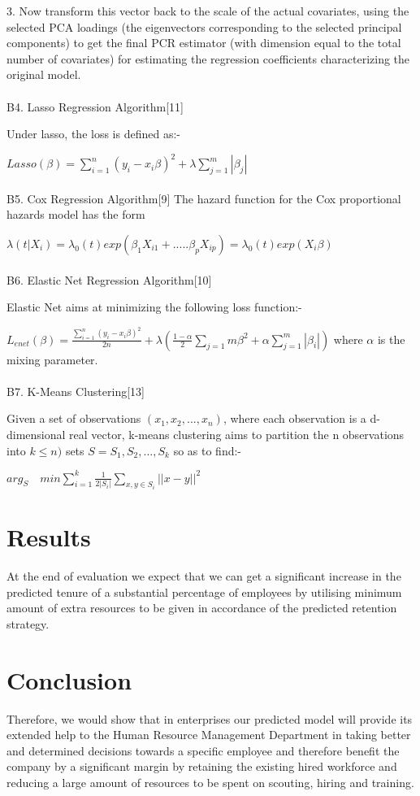 \documentclass[a4paper, 14 pt, conference]{ieeeconf}
\begin{document}
    3. Now transform this vector back to the scale of the actual covariates, using the selected PCA loadings (the eigenvectors corresponding to the selected principal components) to get the final PCR estimator (with dimension equal to the total number of covariates) for estimating the regression coefficients characterizing the original model.
\\
\\
B4. Lasso Regression Algorithm[11]

Under lasso, the loss is defined as:-

$Lasso(\beta)=\sum_{i=1}^{n}(y_{i}-x_{i}\beta)^2+\lambda\sum_{j=1}^{m}|\beta_{j}|$
\\
\\
B5. Cox Regression Algorithm[9]
The hazard function for the Cox proportional hazards model has the form

        $ \lambda(t|X_{i})= \lambda_{0}(t)exp( \beta_{1}X_{i1}+ .....  \beta_{p} X_{ip})= \lambda_{0}(t)exp(X_{i} \beta)$
\\
\\
B6. Elastic Net Regression Algorithm[10]

Elastic Net aims at minimizing the following loss function:-

$L_{enet}(\beta)=\frac{\sum_{i=1}^{n}(y_{i}-x_{i}\beta)^2}{2n}+\lambda(\frac{1-\alpha}{2}\sum_{j=1}{m}\beta^2+\alpha\sum_{j=1}^{m}|\beta_{i}|)$ where $\alpha$ is the mixing parameter.
\\
\\
B7. K-Means Clustering[13]

Given a set of observations $(x_{1}, x_{2}, ..., x_{n})$, where each observation is a d-dimensional real vector, k-means clustering aims to partition the n observations into $k \leq n)$ sets $S = {S_{1}, S_{2}, ..., S_{k}}$ so as to find:-

$arg_{S} \quad min \sum_{i=1}^{k}\frac{1}{2|S_{i}|}\sum_{x,y \in S_{i}}||x-y||^2$


\section{Results}
At the end of evaluation we expect that we can get a significant increase in the predicted tenure of a substantial percentage of employees by utilising minimum amount of extra resources to be given in accordance of the predicted retention strategy.

\section{Conclusion}
Therefore, we would show that in enterprises our predicted model will provide its extended help to the Human Resource Management Department in taking better and determined decisions towards a specific employee and therefore benefit the company by a significant margin  by retaining the existing hired workforce and reducing a large amount of resources to be spent on scouting, hiring and training.
\end{document}
